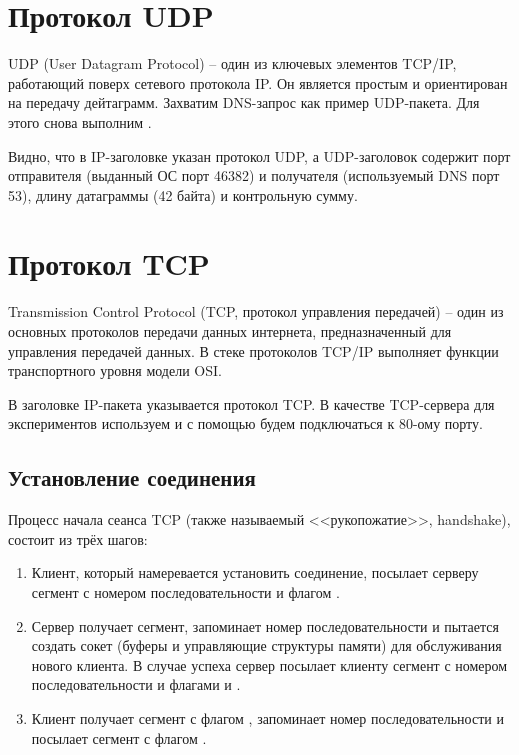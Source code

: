 \newpage

\section{Протокол UDP}

UDP (User Datagram Protocol) -- один из ключевых элементов TCP/IP, работающий поверх сетевого протокола IP. Он является простым и ориентирован на передачу дейтаграмм. Захватим DNS-запрос как пример UDP-пакета. Для этого снова выполним .


Видно, что в IP-заголовке указан протокол UDP, а UDP-заголовок содержит порт отправителя (выданный ОС порт 46382) и получателя (используемый DNS порт 53), длину датаграммы (42 байта) и контрольную сумму.

\section{Протокол TCP}

Transmission Control Protocol (TCP, протокол управления передачей) -- один из основных протоколов передачи данных интернета, предназначенный для управления передачей данных. В стеке протоколов TCP/IP выполняет функции транспортного уровня модели OSI.

В заголовке IP-пакета указывается протокол TCP. В качестве TCP-сервера для экспериментов используем  и с помощью  будем подключаться к 80-ому порту.

\subsection{Установление соединения}

Процесс начала сеанса TCP (также называемый <<рукопожатие>>, handshake), состоит из трёх шагов:

\begin{enumerate}
	\item Клиент, который намеревается установить соединение, посылает серверу сегмент с номером последовательности и флагом . 
	\item Сервер получает сегмент, запоминает номер последовательности и пытается создать сокет (буферы и управляющие структуры памяти) для обслуживания нового клиента. В случае успеха сервер посылает клиенту сегмент с номером последовательности и флагами  и .
	\item Клиент получает сегмент с флагом , запоминает номер последовательности и посылает сегмент с флагом .
\end{enumerate}

